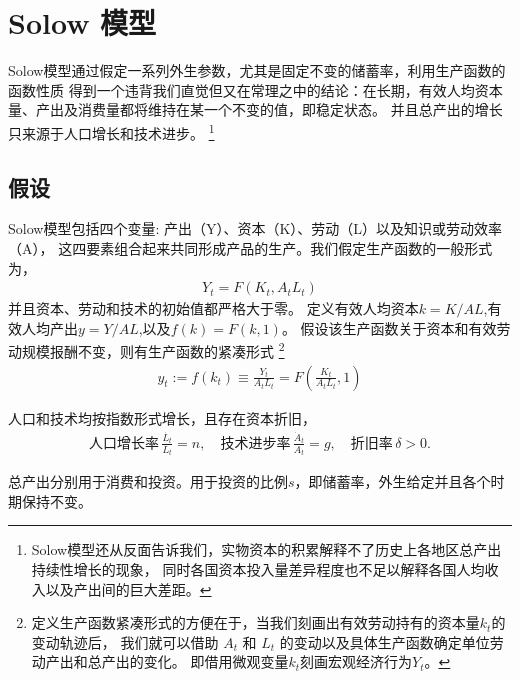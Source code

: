 \documentclass[cn,normal,11pt,black]{elegantnote}
\begin{document}
\newpage
\section{Solow 模型}

Solow模型通过假定一系列外生参数，尤其是固定不变的储蓄率，利用生产函数的函数性质
得到一个违背我们直觉但又在常理之中的结论：在长期，有效人均资本量、产出及消费量都将维持在某一个不变的值，即稳定状态。
并且总产出的增长只来源于人口增长和技术进步。
\footnote{Solow模型还从反面告诉我们，实物资本的积累解释不了历史上各地区总产出持续性增长的现象，
同时各国资本投入量差异程度也不足以解释各国人均收入以及产出间的巨大差距。}

\subsection{假设}

\begin{definition}[生产函数]
    Solow模型包括四个变量: 产出（Y）、资本（K）、劳动（L）以及知识或劳动效率（A），
    这四要素组合起来共同形成产品的生产。我们假定生产函数的一般形式为，
    \begin{align}
        Y_t = F(K_t, A_t L_t)
    \end{align}
    并且资本、劳动和技术的初始值都严格大于零。
    定义有效人均资本$k=K/AL$,有效人均产出$y=Y/AL$,以及$f(k)=F(k,1)$。
    假设该生产函数关于资本和有效劳动规模报酬不变，则有生产函数的紧凑形式
    \footnote{定义生产函数紧凑形式的方便在于，当我们刻画出有效劳动持有的资本量$k_t$的变动轨迹后，
        我们就可以借助 $A_t$ 和 $L_t$ 的变动以及具体生产函数确定单位劳动产出和总产出的变化。
        即借用微观变量$k_t$刻画宏观经济行为$Y_t$。}
    \begin{align}
        y_t := f(k_t) \equiv \frac{Y_t}{A_t L_t} = F(\frac{K_t}{A_t L_t},1) 
    \end{align}
\end{definition} 

\begin{definition}[投入要素]
    人口和技术均按指数形式增长，且存在资本折旧，
\begin{align}
    \mbox{人口增长率} \, \frac{\dot{L_t}}{L_t} = n, \quad
    \mbox{技术进步率} \, \frac{\dot{A}_t}{A_t} = g, \quad
    \mbox{折旧率} \, \delta > 0 .
\end{align}
\end{definition}

\begin{definition}[储蓄率]
    总产出分别用于消费和投资。用于投资的比例$s$，即储蓄率，外生给定并且各个时期保持不变。
\end{definition}
\end{document}

